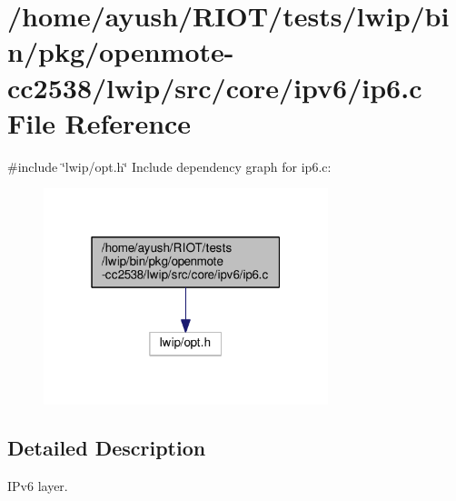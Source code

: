 \hypertarget{openmote-cc2538_2lwip_2src_2core_2ipv6_2ip6_8c}{}\section{/home/ayush/\+R\+I\+O\+T/tests/lwip/bin/pkg/openmote-\/cc2538/lwip/src/core/ipv6/ip6.c File Reference}
\label{openmote-cc2538_2lwip_2src_2core_2ipv6_2ip6_8c}
{\ttfamily \#include \char`\"{}lwip/opt.\+h\char`\"{}}\newline
Include dependency graph for ip6.\+c\+:
\nopagebreak
\begin{figure}[H]
\begin{center}
\leavevmode
\includegraphics[width=235pt]{openmote-cc2538_2lwip_2src_2core_2ipv6_2ip6_8c__incl}
\end{center}
\end{figure}


\subsection{Detailed Description}
I\+Pv6 layer. 